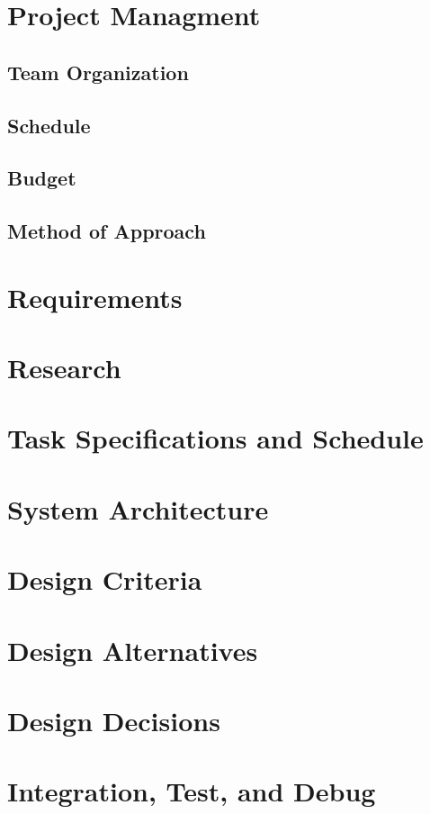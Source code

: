 \documentclass{article}
\begin{document}
\section{Project Managment}
    \subsection{Team Organization}
    \subsection{Schedule}
    \subsection{Budget}
    \subsection{Method of Approach}

\section{Requirements}

\section{Research}

\section{Task Specifications and Schedule}

\section{System Architecture}

\section{Design Criteria}

\section{Design Alternatives}

\section{Design Decisions}

\section{Integration, Test, and Debug}
\end{document}
